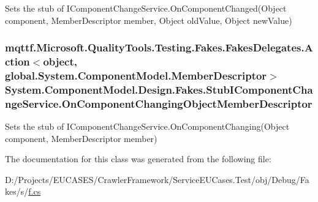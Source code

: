 Sets the stub of I\-Component\-Change\-Service.\-On\-Component\-Changed(\-Object component, Member\-Descriptor member, Object old\-Value, Object new\-Value)

\hypertarget{class_system_1_1_component_model_1_1_design_1_1_fakes_1_1_stub_i_component_change_service_a3aa7d782131fcf48770e504709b2d1d8}{
\subsubsection[{On\-Component\-Changing\-Object\-Member\-Descriptor}]{\setlength{\rightskip}{0pt plus 5cm}mqttf.\-Microsoft.\-Quality\-Tools.\-Testing.\-Fakes.\-Fakes\-Delegates.\-Action$<$object, global.\-System.\-Component\-Model.\-Member\-Descriptor$>$ System.\-Component\-Model.\-Design.\-Fakes.\-Stub\-I\-Component\-Change\-Service.\-On\-Component\-Changing\-Object\-Member\-Descriptor}}\label{class_system_1_1_component_model_1_1_design_1_1_fakes_1_1_stub_i_component_change_service_a3aa7d782131fcf48770e504709b2d1d8}


Sets the stub of I\-Component\-Change\-Service.\-On\-Component\-Changing(\-Object component, Member\-Descriptor member)



The documentation for this class was generated from the following file\-:\begin{DoxyCompactItemize}
\item 
D\-:/\-Projects/\-E\-U\-C\-A\-S\-E\-S/\-Crawler\-Framework/\-Service\-E\-U\-Cases.\-Test/obj/\-Debug/\-Fakes/s/\hyperlink{s_2f_8cs}{f.\-cs}\end{DoxyCompactItemize}
